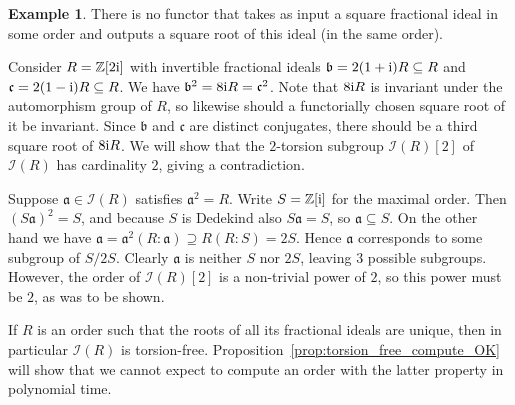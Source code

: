 \documentclass{amsart}
\theoremstyle{plain}
\theoremstyle{definition}
\newtheorem{example}[theorem]{Example}
\newcommand{\Z}{\ensuremath{\mathbb{Z}}}
\begin{document}
\begin{example}\label{ex:non-functor}
There is no functor that takes as input a square fractional ideal in some order and outputs a square root of this ideal (in the same order).

Consider \(R=\Z[2\textup{i}]\) with invertible fractional ideals \(\mathfrak{b}=2(1+\textup{i}) R\subseteq R\) and \(\mathfrak{c}=2(1-\textup{i})R\subseteq R\).
We have \(\mathfrak{b}^2=8\textup{i} R =\mathfrak{c}^2\).
Note that \(8\textup{i} R\) is invariant under the automorphism group of \(R\), so likewise should a functorially chosen square root of it be invariant.
Since \(\mathfrak{b}\) and \(\mathfrak{c}\) are distinct conjugates, there should be a third square root of \(8\textup{i}R\).
We will show that the \(2\)-torsion subgroup \(\mathcal{I}(R)[2]\) of \(\mathcal{I}(R)\) has cardinality \(2\), giving a contradiction.

Suppose \(\mathfrak{a}\in\mathcal{I}(R)\) satisfies \(\mathfrak{a}^2=R\). Write \(S=\Z[\textup{i}]\) for the maximal order.
Then \((S\mathfrak{a})^2=S\), and because \(S\) is Dedekind also \(S\mathfrak{a} = S\), so \(\mathfrak{a}\subseteq S\).
On the other hand we have \(\mathfrak{a} = \mathfrak{a}^2 (R : \mathfrak{a}) \supseteq R (R : S) = 2S\).
Hence \(\mathfrak{a}\) corresponds to some subgroup of \(S/2S\).
Clearly \(\mathfrak{a}\) is neither \(S\) nor \(2S\), leaving \(3\) possible subgroups.
However, the order of \(\mathcal{I}(R)[2]\) is a non-trivial power of \(2\), so this power must be \(2\), as was to be shown.
\end{example}

If \(R\) is an order such that the roots of all its fractional ideals are unique, then in particular \(\mathcal{I}(R)\) is torsion-free. Proposition~\ref{prop:torsion_free_compute_OK} will show that we cannot expect to compute an order with the latter property in polynomial time. 
\end{document}
